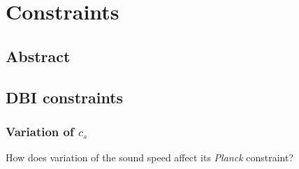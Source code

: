 \chapter{Constraints}
\section{Abstract}\label{sec:constraints_abstract}
\section{DBI constraints}\label{sec:dbi_constraints}
\subsection{Variation of $c_s$}
How does variation of the sound speed affect its \textit{Planck} constraint?
